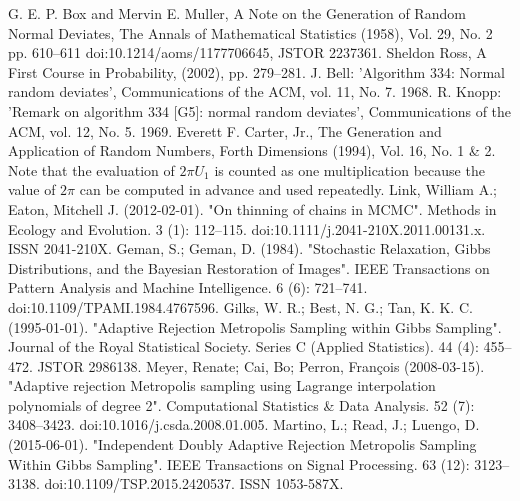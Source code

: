 \documentclass[twoside,twocolumn]{article}
\begin{document}
\begin{CJK*}{UTF8}{gkai}
\newpage
\renewcommand\refname{参考文献}
\begin{thebibliography}{99}
G. E. P. Box and Mervin E. Muller, A Note on the Generation of Random Normal Deviates, The Annals of Mathematical Statistics (1958), Vol. 29, No. 2 pp. 610–611 doi:10.1214/aoms/1177706645, JSTOR 2237361.
Sheldon Ross, A First Course in Probability, (2002), pp. 279–281.
J. Bell: 'Algorithm 334: Normal random deviates', Communications of the ACM, vol. 11, No. 7. 1968.
R. Knopp: 'Remark on algorithm 334 [G5]: normal random deviates', Communications of the ACM, vol. 12, No. 5. 1969.
Everett F. Carter, Jr., The Generation and Application of Random Numbers, Forth Dimensions (1994), Vol. 16, No. 1 \& 2.
Note that the evaluation of $2\pi U_{1}$ is counted as one multiplication because the value of $2\pi$ can be computed in advance and used repeatedly.
Link, William A.; Eaton, Mitchell J. (2012-02-01). "On thinning of chains in MCMC". Methods in Ecology and Evolution. 3 (1): 112–115. doi:10.1111/j.2041-210X.2011.00131.x. ISSN 2041-210X.
Geman, S.; Geman, D. (1984). "Stochastic Relaxation, Gibbs Distributions, and the Bayesian Restoration of Images". IEEE Transactions on Pattern Analysis and Machine Intelligence. 6 (6): 721–741. doi:10.1109/TPAMI.1984.4767596.
Gilks, W. R.; Best, N. G.; Tan, K. K. C. (1995-01-01). "Adaptive Rejection Metropolis Sampling within Gibbs Sampling". Journal of the Royal Statistical Society. Series C (Applied Statistics). 44 (4): 455–472. JSTOR 2986138.
Meyer, Renate; Cai, Bo; Perron, François (2008-03-15). "Adaptive rejection Metropolis sampling using Lagrange interpolation polynomials of degree 2". Computational Statistics \& Data Analysis. 52 (7): 3408–3423. doi:10.1016/j.csda.2008.01.005.
Martino, L.; Read, J.; Luengo, D. (2015-06-01). "Independent Doubly Adaptive Rejection Metropolis Sampling Within Gibbs Sampling". IEEE Transactions on Signal Processing. 63 (12): 3123–3138. doi:10.1109/TSP.2015.2420537. ISSN 1053-587X.
\end{thebibliography} 

\end{CJK*}
\end{document}
